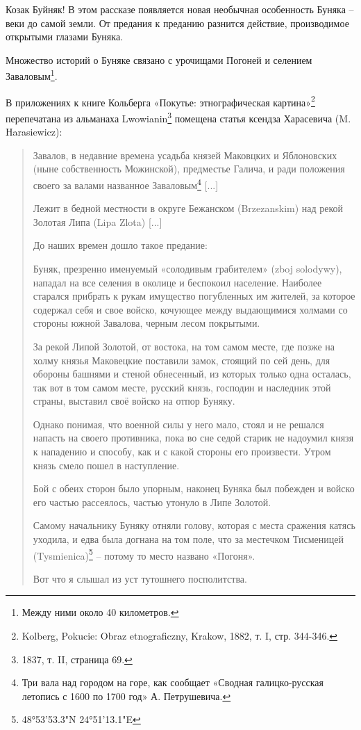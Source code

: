 Козак Буйняк! В этом рассказе появляется новая необычная особенность Буняка – веки до самой земли. От предания к преданию разнится действие, производимое открытыми глазами Буняка.

Множество историй о Буняке связано с урочищами Погоней и селением Заваловым\footnote{Между ними около 40 километров.}.

В приложениях к книге Кольберга «Покутье: этнографическая картина»\footnote{Kolberg, Pokucie: Obraz etnograficzny, Krakow, 1882, т. I, стр. 344-346.} перепечатана из альманаха Lwowianin\footnote{1837, т. II, страница 69.} помещена статья ксендза Харасевича (M. Harasiewicz):

\begin{quotation}
Завалов, в недавние времена усадьба князей Маковцких и Яблоновских (ныне собственность Можинской), предместье Галича, и ради положения своего за валами названное Заваловым\footnote{Три вала над городом на горе, как сообщает «Сводная галицко-русская летопись с 1600 по 1700 год» А. Петрушевича.} [...]

Лежит в бедной местности в округе Бежанском (Brzezanskim) над рекой Золотая Липа (Lipa Zlota) [...]

До наших времен дошло такое предание:

Буняк, презренно именуемый «солодивым грабителем» (zboj solodywy), нападал на все селения в околице и беспокоил население. Наиболее старался прибрать к рукам имущество погубленных им жителей, за которое содержал себя и свое войско, кочующее между выдающимися холмами со стороны южной Завалова, черным лесом покрытыми.

За рекой Липой Золотой, от востока, на том самом месте, где позже на холму князья Маковецкие поставили замок, стоящий по сей день, для обороны башнями и стеной обнесенный, из которых только одна осталась, так вот в том самом месте, русский князь, господин и наследник этой страны, выставил своё войско на отпор Буняку.

Однако понимая, что военной силы у него мало, стоял и не решался напасть на своего противника, пока во сне седой старик не надоумил князя к нападению и способу, как и с какой стороны его произвести. Утром князь смело пошел в наступление. 

Бой с обеих сторон было упорным, наконец Буняка был побежден и войско его частью рассеялось, частью утонуло в Липе Золотой.

Самому начальнику Буняку отняли голову, которая с места сражения катясь уходила, и едва была догнана на том поле, что за местечком Тисменицей (Tysmienica)\footnote{48°53'53.3"N 24°51'13.1"E} – потому то место названо «Погоня».

Вот что я слышал из уст тутошнего посполитства. 
\end{quotation}

